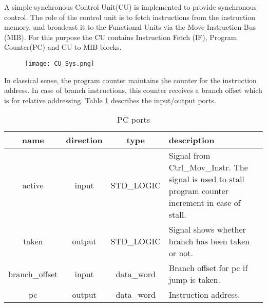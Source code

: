 
		A simple synchronous Control Unit(CU) is implemented to provide synchronous control.
The role of the control unit is to fetch instructions from the instruction memory, and broadcast it to the Functional Units via the Move Instruction Bus (MIB). For this purpose the CU contains Instruction Fetch (IF), Program Counter(PC) and  CU to MIB blocks.

\begin{figure}[!h]

\texttt{[image: CU\_Sys.png]}

\end{figure}


		In classical sense, the program counter maintains the counter for the instruction address.
In case of branch instructions, this counter receives a branch offset which is for relative addressing. Table \ref{table:pc_description} describes the input/output ports.		

	\begin{table}[!h]
		\begin{tabular}{| c| c | c | p{9cm} |}
			\hline
			\textbf{name} & \textbf{direction} & \textbf{type} &  \textbf{description}\\ \hline			
			active & input & STD\_LOGIC & Signal from Ctrl\_Mov\_Instr. The signal is used to stall			 program counter increment in case of stall.  \\ \hline
			taken & output & STD\_LOGIC & Signal shows whether branch has been taken or not.  \\ \hline
			branch\_offset & input & data\_word & Branch offset for pc if jump is taken.  \\ \hline			
			pc & output & data\_word & Instruction address.  \\ \hline
			
				
		\end{tabular}
		
		\caption{PC ports \label{table:pc_description}}
		\centering
	\end{table}

